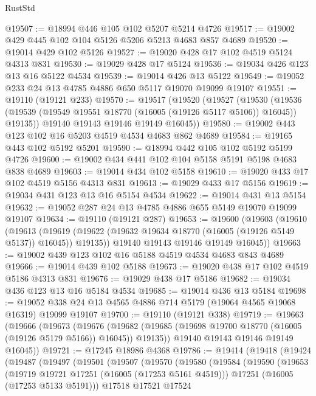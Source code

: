 \begin{lexlean}{RustStd}
\begin{coremodule}
@19507 := @18994 @446 @105 @102 @5207 @5214 @4726
@19517 := @19002 @429 @445 @102 @104 @5126 @5206 @5213 @4683 @857 @4689
@19520 := @19014 @429 @102 @5126
@19527 := @19020 @428 @17 @102 @4519 @5124 @4313 @831
@19530 := @19029 @428 @17 @5124
@19536 := @19034 @426 @123 @13 @16 @5122 @4534
@19539 := @19014 @426 @13 @5122
@19549 := @19052 @233 @24 @13 @4785 @4886 @650 @5117 @19070 @19099 @19107
@19551 := @19110 (@19121 @233)
@19570 := @19517
    (@19520
      (@19527
        (@19530
          (@19536 (@19539 (@19549 @19551 @18770 (@16005 (@19126 @5117 @5106)) @16045)) @19135))
        @19140
        @19143
        @19146
        @19149
        @16045))
@19580 := @19002 @443 @123 @102 @16 @5203 @4519 @4534 @4683 @862 @4689
@19584 := @19165 @443 @102 @5192 @5201
@19590 := @18994 @442 @105 @102 @5192 @5199 @4726
@19600 := @19002 @434 @441 @102 @104 @5158 @5191 @5198 @4683 @838 @4689
@19603 := @19014 @434 @102 @5158
@19610 := @19020 @433 @17 @102 @4519 @5156 @4313 @831
@19613 := @19029 @433 @17 @5156
@19619 := @19034 @431 @123 @13 @16 @5154 @4534
@19622 := @19014 @431 @13 @5154
@19632 := @19052 @287 @24 @13 @4785 @4886 @655 @5149 @19070 @19099 @19107
@19634 := @19110 (@19121 @287)
@19653 := @19600
    (@19603
      (@19610
        (@19613
          (@19619 (@19622 (@19632 @19634 @18770 (@16005 (@19126 @5149 @5137)) @16045)) @19135))
        @19140
        @19143
        @19146
        @19149
        @16045))
@19663 := @19002 @439 @123 @102 @16 @5188 @4519 @4534 @4683 @843 @4689
@19666 := @19014 @439 @102 @5188
@19673 := @19020 @438 @17 @102 @4519 @5186 @4313 @831
@19676 := @19029 @438 @17 @5186
@19682 := @19034 @436 @123 @13 @16 @5184 @4534
@19685 := @19014 @436 @13 @5184
@19698 := @19052 @338 @24 @13 @4565 @4886 @714 @5179 (@19064 @4565 @19068 @16319) @19099 @19107
@19700 := @19110 (@19121 @338)
@19719 := @19663
    (@19666
      (@19673
        (@19676
          (@19682 (@19685 (@19698 @19700 @18770 (@16005 (@19126 @5179 @5166)) @16045)) @19135))
        @19140
        @19143
        @19146
        @19149
        @16045))
@19721 := @17245 @18986 @4368
@19786 := @19414
    (@19418
      (@19424
        (@19487
          (@19497
            (@19501
              (@19507
                (@19570
                  (@19580
                    (@19584
                      (@19590
                        (@19653
                          (@19719 @19721 @17251 (@16005 (@17253 @5161 @4519)))
                          @17251
                          (@16005 (@17253 @5133 @5191)))
                        @17518
                        @17521
                        @17524

\end{coremodule}
\end{lexlean}
